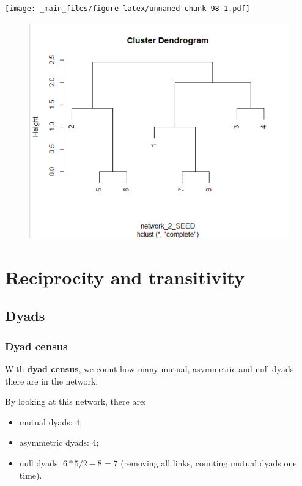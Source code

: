 \documentclass[
  notitlepage,
  onecolumn,
  openany]{book}
\providecommand{\tightlist}{%
  \setlength{\itemsep}{0pt}\setlength{\parskip}{0pt}}
\begin{document}
\texttt{[image: \_main\_files/figure-latex/unnamed-chunk-98-1.pdf]}

\begin{figure}[h!]

{\centering \includegraphics[width=0.5\linewidth]{images/11-Subgroups and Structural Equivalence/Untitled 11} 

}

\end{figure}

\hypertarget{reciprocity-and-transitivity}{%
\chapter{Reciprocity and transitivity}\label{reciprocity-and-transitivity}}

\hypertarget{dyads}{%
\section{Dyads}\label{dyads}}

\hypertarget{dyad-census}{%
\subsection{Dyad census}\label{dyad-census}}

With \textbf{dyad census}, we count how many mutual, asymmetric and null dyads there are in the network.

By looking at this network, there are:

\begin{itemize}
\tightlist
\item
  mutual dyads: \(4\);
\item
  asymmetric dyads: \(4\);
\item
  null dyads: \(6*5/2 - 8 = 7\) (removing all links, counting mutual dyads one time).
\end{itemize}
\end{document}
